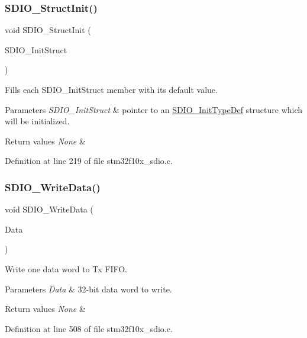 \subsubsection{\texorpdfstring{S\+D\+I\+O\+\_\+\+Struct\+Init()}{SDIO\_StructInit()}}
{\footnotesize\ttfamily void S\+D\+I\+O\+\_\+\+Struct\+Init (\begin{DoxyParamCaption}\item[{\hyperlink{struct_s_d_i_o___init_type_def}{S\+D\+I\+O\+\_\+\+Init\+Type\+Def} $\ast$}]{S\+D\+I\+O\+\_\+\+Init\+Struct }\end{DoxyParamCaption})}



Fills each S\+D\+I\+O\+\_\+\+Init\+Struct member with its default value. 


\begin{DoxyParams}{Parameters}
{\em S\+D\+I\+O\+\_\+\+Init\+Struct} & pointer to an \hyperlink{struct_s_d_i_o___init_type_def}{S\+D\+I\+O\+\_\+\+Init\+Type\+Def} structure which will be initialized. \\
\hline
\end{DoxyParams}

\begin{DoxyRetVals}{Return values}
{\em None} & \\
\hline
\end{DoxyRetVals}


Definition at line 219 of file stm32f10x\+\_\+sdio.\+c.

\mbox{\label{group___s_d_i_o___private___functions_ga361008b5252aa33b5f2b5823ee3d7240}} 
\subsubsection{\texorpdfstring{S\+D\+I\+O\+\_\+\+Write\+Data()}{SDIO\_WriteData()}}
{\footnotesize\ttfamily void S\+D\+I\+O\+\_\+\+Write\+Data (\begin{DoxyParamCaption}\item[{uint32\+\_\+t}]{Data }\end{DoxyParamCaption})}



Write one data word to Tx F\+I\+FO. 


\begin{DoxyParams}{Parameters}
{\em Data} & 32-\/bit data word to write. \\
\hline
\end{DoxyParams}

\begin{DoxyRetVals}{Return values}
{\em None} & \\
\hline
\end{DoxyRetVals}


Definition at line 508 of file stm32f10x\+\_\+sdio.\+c.

